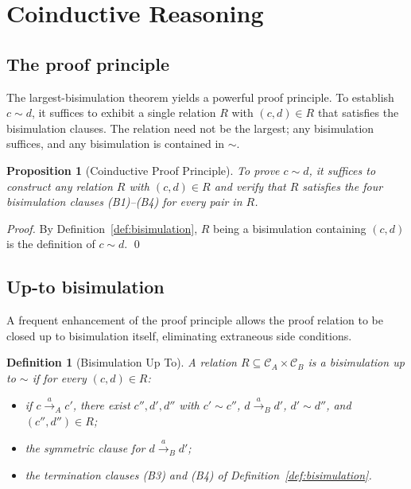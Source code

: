 \documentclass[twocolumn,11pt,a4paper]{article}
\newtheorem{proposition}[theorem]{Proposition}
\newtheorem{definition}[theorem]{Definition}
\newcommand{\Conf}{\mathcal{C}}
\newcommand{\bisim}{\sim}
\begin{document}
\section{Coinductive Reasoning}
\label{sec:coinduction}

\subsection{The proof principle}

The largest-bisimulation theorem yields a powerful proof principle. To establish $c \bisim d$, it suffices to exhibit a single relation $R$ with $(c, d) \in R$ that satisfies the bisimulation clauses. The relation need not be the largest; any bisimulation suffices, and any bisimulation is contained in $\bisim$.

\begin{proposition}[Coinductive Proof Principle]
\label{prop:coinduction}
To prove $c \bisim d$, it suffices to construct any relation $R$ with $(c, d) \in R$ and verify that $R$ satisfies the four bisimulation clauses (B1)--(B4) for every pair in $R$.
\end{proposition}

\begin{proof}
By Definition~\ref{def:bisimulation}, $R$ being a bisimulation containing $(c, d)$ is the definition of $c \bisim d$. \qed
\end{proof}

\subsection{Up-to bisimulation}

A frequent enhancement of the proof principle allows the proof relation to be closed up to bisimulation itself, eliminating extraneous side conditions.

\begin{definition}[Bisimulation Up To]
\label{def:up-to}
A relation $R \subseteq \Conf_A \times \Conf_B$ is a \emph{bisimulation up to $\bisim$} if for every $(c, d) \in R$:
\begin{itemize}[nosep,leftmargin=*]
\item if $c \xrightarrow{a}_A c'$, there exist $c'', d', d''$ with $c' \bisim c''$, $d \xrightarrow{a}_B d'$, $d' \bisim d''$, and $(c'', d'') \in R$;
\item the symmetric clause for $d \xrightarrow{a}_B d'$;
\item the termination clauses (B3) and (B4) of Definition~\ref{def:bisimulation}.
\end{itemize}
\end{definition}
\end{document}
